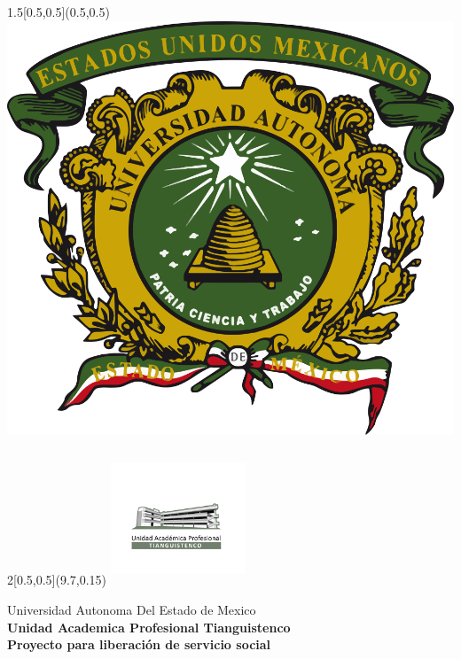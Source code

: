 \begin{titlepage}
	\BgThispage
	\begin{textblock}{1.5}[0.5,0.5](0.5,0.5)
		\includegraphics[width=\linewidth]{../images/uaemexlogo.png}\\[3.5cm]
	\end{textblock}
	
	\begin{textblock}{2}[0.5,0.5](9.7,0.15)
		\includegraphics[width=4cm,height=4cm]{../images/images.png}\\[2cm]
	\end{textblock}
	
	\begin{center}
		{Universidad Autonoma Del Estado de Mexico\\[0.2cm]
			\textbf{Unidad Academica Profesional Tianguistenco}}\\[0.2cm]
		\vspace{2cm}
		{\large \textbf{Proyecto para liberación de servicio  social}}\\[0.6cm]
		

\end{center}
\end{titlepage}
